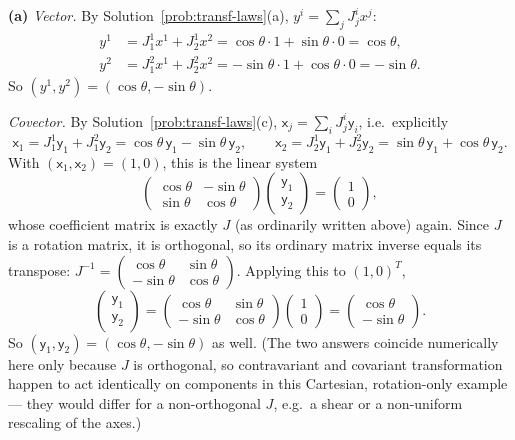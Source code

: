 \documentclass[11pt]{article}
\begin{document}
\textbf{(a)} \emph{Vector.} By Solution~\ref{prob:transf-laws}(a), $y^i=\sum_jJ_j^ix^j$:
\begin{align*}
y^1&=J_1^1x^1+J_2^1x^2=\cos\theta\cdot1+\sin\theta\cdot0=\cos\theta, \\
y^2&=J_1^2x^1+J_2^2x^2=-\sin\theta\cdot1+\cos\theta\cdot0=-\sin\theta.
\end{align*}
So $(y^1,y^2)=(\cos\theta,-\sin\theta)$.

\emph{Covector.} By Solution~\ref{prob:transf-laws}(c), $\mathsf x_j=\sum_iJ_j^i\mathsf y_i$, i.e.\ explicitly
\[
\mathsf x_1=J_1^1\mathsf y_1+J_1^2\mathsf y_2=\cos\theta\,\mathsf y_1-\sin\theta\,\mathsf y_2, \qquad \mathsf x_2=J_2^1\mathsf y_1+J_2^2\mathsf y_2=\sin\theta\,\mathsf y_1+\cos\theta\,\mathsf y_2.
\]
With $(\mathsf x_1,\mathsf x_2)=(1,0)$, this is the linear system
\[
\begin{pmatrix}\cos\theta&-\sin\theta\\ \sin\theta&\cos\theta\end{pmatrix}\begin{pmatrix}\mathsf y_1\\\mathsf y_2\end{pmatrix}=\begin{pmatrix}1\\0\end{pmatrix},
\]
whose coefficient matrix is exactly $J$ (as ordinarily written above) again. Since $J$ is a rotation matrix, it is orthogonal, so its ordinary matrix inverse equals its transpose: $J^{-1}=\begin{pmatrix}\cos\theta&\sin\theta\\-\sin\theta&\cos\theta\end{pmatrix}$. Applying this to $(1,0)^T$,
\[
\begin{pmatrix}\mathsf y_1\\\mathsf y_2\end{pmatrix}=\begin{pmatrix}\cos\theta&\sin\theta\\-\sin\theta&\cos\theta\end{pmatrix}\begin{pmatrix}1\\0\end{pmatrix}=\begin{pmatrix}\cos\theta\\-\sin\theta\end{pmatrix}.
\]
So $(\mathsf y_1,\mathsf y_2)=(\cos\theta,-\sin\theta)$ as well. (The two answers coincide numerically here only because $J$ is orthogonal, so contravariant and covariant transformation happen to act identically on components in this Cartesian, rotation-only example --- they would differ for a non-orthogonal $J$, e.g.\ a shear or a non-uniform rescaling of the axes.)
\end{document}
